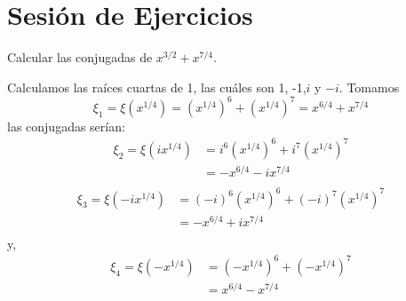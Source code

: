 \documentclass[12pt]{report}
\newcounter{it}
\theoremstyle{largebreak}
\begin{document}
    \newpage

    \section{Sesión de Ejercicios}

    \begin{exa}
        Calcular las conjugadas de $x^{ 3/2}+x^{ 7/4}$.
    \end{exa}

    \begin{sol}
        Calculamos las raíces cuartas de 1, las cuáles son 1, -1,$i$ y $-i$. Tomamos
        \begin{equation*}
            \xi_1=\xi(x^{ 1/4})=(x^{1/4})^6+(x^{1/4})^7=x^{6/4}+x^{7/4}
        \end{equation*}
        las conjugadas serían:
        \begin{equation*}
            \begin{split}
                \xi_2=\xi(ix^{ 1/4})&=i^6(x^{1/4})^6+i^7(x^{1/4})^7\\
                &=-x^{6/4}-ix^{7/4}\\
            \end{split}
        \end{equation*}
        \begin{equation*}
            \begin{split}
                \xi_3=\xi(-ix^{ 1/4})&=(-i)^6(x^{1/4})^6+(-i)^7(x^{1/4})^7\\
                &=-x^{6/4}+ix^{7/4}\\
            \end{split}
        \end{equation*}
        y,
        \begin{equation*}
            \begin{split}
                \xi_4=\xi(-x^{ 1/4})&=(-x^{1/4})^6+(-x^{1/4})^7\\
                &=x^{6/4}-x^{7/4}\\
            \end{split}
        \end{equation*}
    \end{sol}
\end{document}

